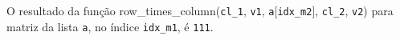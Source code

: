\documentclass[12pt,varwidth=16cm,border=1pt]{standalone}
\begin{document}
O resultado da função row\_times\_column(\verb+cl_1+, \verb+v1+, \verb+a+[\verb+idx_m2+], \verb+cl_2+, \verb+v2+) para matriz da lista \verb+a+, no índice \verb+idx_m1+, é \verb+111+.

\questiomfalse
\end{document}
